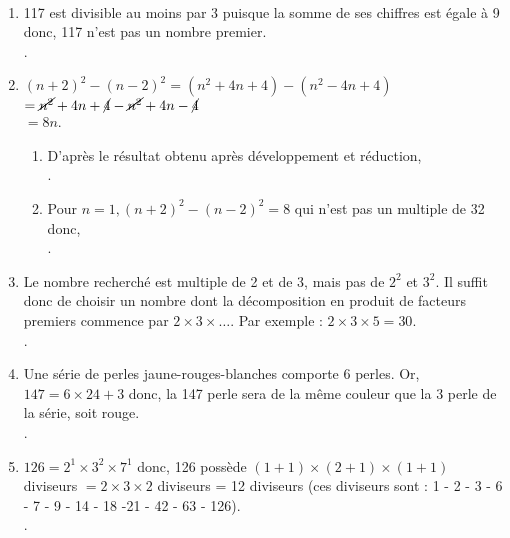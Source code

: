 \ \\ [-5mm]
\begin{enumerate}
   \item 117 est divisible au moins par 3 puisque la somme de ses chiffres est égale à 9 donc, 117 n'est pas un nombre premier. \\
   .
   \item
   $(n+2)^2 - (n-2)^2 =(n^2+4n+4)-(n^2-4n+4)$ \\
   \hspace*{3.15cm} $=\cancel{n^2}+4n+\cancel{4}-\cancel{n^2}+4n-\cancel{4}$ \\
   \hspace*{3.15cm} $=8n$. \\
   \begin{enumerate}
      \item D'après le résultat obtenu après développement et réduction, \\
      .
      \item Pour $n =1, (n+2)^2 - (n-2)^2 =8$ qui n'est pas un multiple de 32 donc, \\
      .
   \end{enumerate}
   \item Le nombre recherché est multiple de 2 et de 3, mais pas de $2^2$ et $3^2$. Il suffit donc de choisir un nombre dont la décomposition en produit de facteurs premiers commence par $2\times3\times\dots$. Par exemple : $2\times3\times5 =30$. \\
   .
   \item Une série de perles \og jaune-rouges-blanches \fg{} comporte 6 perles. Or, $147 =6\times24+3$ donc, la 147 perle sera de la même couleur que la 3 perle de la série, soit rouge. \\
   .
   \item $126 =2^1\times3^2\times7^1$ donc, 126 possède $(1+1)\times(2+1)\times(1+1)$ diviseurs $=2\times3\times2$ diviseurs = 12 diviseurs (ces diviseurs sont : 1 - 2 - 3 - 6 - 7 - 9 - 14 - 18 -21 - 42 - 63 - 126). \\
   .
\end{enumerate}
